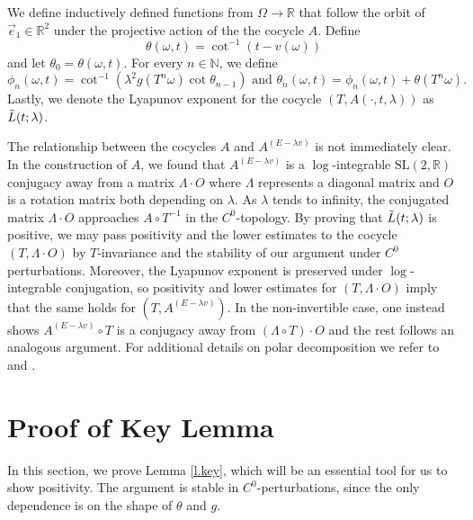 \documentclass{amsart}
\newcommand{\NN}{\mathbb{N}}
\newcommand{\RR}{\mathbb{R}}
\begin{document}
We define inductively defined functions from $\Omega\rightarrow \RR$ that follow the orbit of $\vec{e}_1\in \RR^2$ under the projective action of the the cocycle $A$. Define
\[\theta(\omega, t) = \cot^{-1}(t-v(\omega))\]
and let $\theta_0 = \theta(\omega,t)$. For every $n\in \NN$, we define
\[\phi_n(\omega, t) = \cot^{-1}(\lambda^2 g(T^n\omega)\cot\theta_{n-1}) \text{ and } \theta_n(\omega, t) = \phi_n(\omega, t) + \theta(T^n\omega).\]
Lastly, we denote the Lyapunov exponent for the cocycle $(T, A(\cdot, t, \lambda))$ as $\Tilde{L}(t;\lambda)$. 

The relationship between the cocycles $A$ and $A^{(E-\lambda v)}$ is not immediately clear. In the construction of $A$, we found that $A^{(E-\lambda v)}$ is a $\log$-integrable $\mathrm{SL}(2, \RR)$ conjugacy away from a matrix $\Lambda\cdot O$ where $\Lambda$ represents a diagonal matrix and $O$ is a rotation matrix both depending on $\lambda$. As $\lambda$ tends to infinity, the conjugated matrix $\Lambda\cdot O$ approaches $A\circ T^{-1}$ in the $C^0$-topology. By proving that $\Tilde{L}(t;\lambda)$ is positive, we may pass positivity and the lower estimates to the cocycle $(T,\Lambda\cdot O)$ by $T$-invariance and the stability of our argument under $C^0$ perturbations. Moreover, the Lyapunov exponent is preserved under $\log$-integrable conjugation, so positivity and lower estimates for $(T,\Lambda\cdot O)$ imply that the same holds for $(T,A^{(E-\lambda v)})$. In the non-invertible case, one instead shows $A^{(E-\lambda v)} \circ T$ is a conjugacy away from $(\Lambda \circ T) \cdot O$ and the rest follows an analogous argument. For additional details on polar decomposition we refer to \cite{zhenghe1} and \cite[Appendix A]{zhenghe2}.

\section{Proof of Key Lemma}\hypertarget{pfkey}{}

In this section, we prove Lemma \ref{l.key}, which will be an essential tool for us to show positivity. The argument is stable in $C^0$-perturbations, since the only dependence is on the shape of $\theta$ and $g$.
\end{document}
